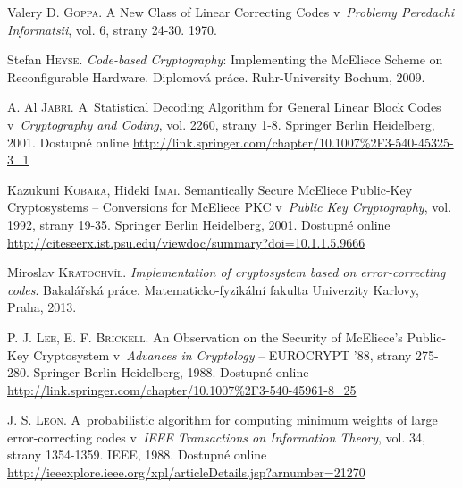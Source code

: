 \documentclass[thesis=M,czech,hidelinks]{FITthesis}[2012/06/26]
\newcommand{\0}{{\textcolor[gray]{0.80}{0}}}
\begin{document}
\begin{thebibliography}{99}
%

        Valery D. \textsc{Goppa}. A New Class of Linear Correcting Codes
        v~\emph{Problemy Peredachi Informatsii}, vol. 6, strany 24-30. 1970.

        Stefan \textsc{Heyse}. \emph{Code-based Cryptography}: Implementing the
        McEliece Scheme on Reconfigurable Hardware. Diplomová práce.
        Ruhr-University Bochum, 2009.

        A. Al \textsc{Jabri}. A~Statistical Decoding Algorithm for General
        Linear Block Codes v~\emph{Cryptography and Coding}, vol. 2260, strany
        1-8. Springer Berlin Heidelberg, 2001. Dostupné online
        \url{http://link.springer.com/chapter/10.1007\%2F3-540-45325-3\_1}

        Kazukuni \textsc{Kobara}, Hideki \textsc{Imai}. Semantically Secure
        McEliece Public-Key Cryptosystems -- Conversions for McEliece PKC
        v~\emph{Public Key Cryptography}, vol. 1992, strany 19-35. Springer
        Berlin Heidelberg, 2001. Dostupné online
        \url{http://citeseerx.ist.psu.edu/viewdoc/summary?doi=10.1.1.5.9666}

        Miroslav \textsc{Kratochvíl}. \emph{Implementation of cryptosystem based
        on error-correcting codes}. Bakalářská práce. Matematicko-fyzikální
        fakulta Univerzity Karlovy, Praha, 2013.

        P. J. \textsc{Lee}, E. F. \textsc{Brickell}. An Observation on the
        Security of McEliece's Public-Key Cryptosystem v~\emph{Advances in
        Cryptology} -- EUROCRYPT '88, strany 275-280. Springer Berlin
        Heidelberg, 1988. Dostupné online
        \url{http://link.springer.com/chapter/10.1007\%2F3-540-45961-8\_25}

        J. S. \textsc{Leon}. A~probabilistic algorithm for computing minimum
        weights of large error-correcting codes v~\emph{IEEE Transactions on
        Information Theory}, vol. 34, strany 1354-1359. IEEE, 1988. Dostupné
        online
        \url{http://ieeexplore.ieee.org/xpl/articleDetails.jsp?arnumber=21270}


\end{thebibliography}
\end{document}

